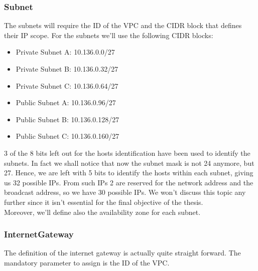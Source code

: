
\subsubsection{Subnet}
The subnets will require the ID of the VPC and the CIDR block that defines their IP scope.
For the subnets we'll use the following CIDR blocks:
\begin{itemize}
  \item Private Subnet A: 10.136.0.0/27
  \item Private Subnet B: 10.136.0.32/27
  \item Private Subnet C: 10.136.0.64/27
  \item Public Subnet A: 10.136.0.96/27
  \item Public Subnet B: 10.136.0.128/27
  \item Public Subnet C: 10.136.0.160/27
\end{itemize}
3 of the 8 bits left out for the hosts identification have been used to identify the subnets.
In fact we shall notice that now the subnet mask is not 24 anymore, but 27.
Hence, we are left with 5 bits to identify the hosts within each subnet, giving us 32 possible IPs.
From such IPs 2 are reserved for the network address and the broadcast address, so we have 30 possible IPs.
We won't discuss this topic any further since it isn't essential for the final objective of the thesis.\\
Moreover, we'll define also the availability zone for each subnet.


\subsubsection{InternetGateway}
The definition of the internet gateway is actually quite straight forward.
The mandatory parameter to assign is the ID of the VPC.

